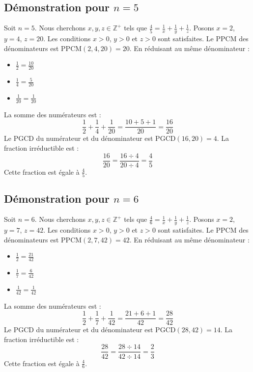 \documentclass[11pt,a4paper]{article}
\begin{document}
\subsection{Démonstration pour $n = 5$}
Soit $n = 5$. Nous cherchons $x, y, z \in \mathbb{Z}^{+}$ tels que $\frac{4}{5} = \frac{1}{x} + \frac{1}{y} + \frac{1}{z}$.
Posons $x = 2$, $y = 4$, $z = 20$.
Les conditions $x > 0$, $y > 0$ et $z > 0$ sont satisfaites.
Le PPCM des dénominateurs est $\text{PPCM}(2, 4, 20) = 20$.
En réduisant au même dénominateur :
\begin{itemize}
    \item $\frac{1}{2} = \frac{10}{20}$
    \item $\frac{1}{4} = \frac{5}{20}$
    \item $\frac{1}{20} = \frac{1}{20}$
\end{itemize}
La somme des numérateurs est :
$$ \frac{1}{2} + \frac{1}{4} + \frac{1}{20} = \frac{10 + 5 + 1}{20} = \frac{16}{20} $$
Le PGCD du numérateur et du dénominateur est $\text{PGCD}(16, 20) = 4$.
La fraction irréductible est :
$$ \frac{16}{20} = \frac{16 \div 4}{20 \div 4} = \frac{4}{5} $$
Cette fraction est égale à $\frac{4}{5}$.

\subsection{Démonstration pour $n = 6$}
Soit $n = 6$. Nous cherchons $x, y, z \in \mathbb{Z}^{+}$ tels que $\frac{4}{6} = \frac{1}{x} + \frac{1}{y} + \frac{1}{z}$.
Posons $x = 2$, $y = 7$, $z = 42$.
Les conditions $x > 0$, $y > 0$ et $z > 0$ sont satisfaites.
Le PPCM des dénominateurs est $\text{PPCM}(2, 7, 42) = 42$.
En réduisant au même dénominateur :
\begin{itemize}
    \item $\frac{1}{2} = \frac{21}{42}$
    \item $\frac{1}{7} = \frac{6}{42}$
    \item $\frac{1}{42} = \frac{1}{42}$
\end{itemize}
La somme des numérateurs est :
$$ \frac{1}{2} + \frac{1}{7} + \frac{1}{42} = \frac{21 + 6 + 1}{42} = \frac{28}{42} $$
Le PGCD du numérateur et du dénominateur est $\text{PGCD}(28, 42) = 14$.
La fraction irréductible est :
$$ \frac{28}{42} = \frac{28 \div 14}{42 \div 14} = \frac{2}{3} $$
Cette fraction est égale à $\frac{4}{6}$.
\end{document}
